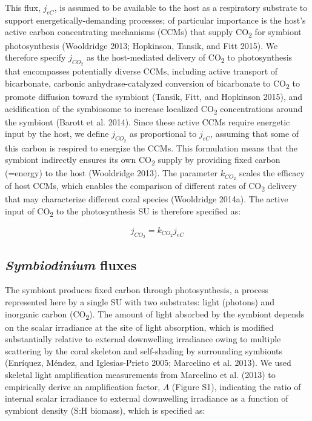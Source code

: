 \documentclass[]{elsarticle} %
\begin{document}
This flux, \(j_{eC}\), is assumed to be available to the host as a
respiratory substrate to support energetically-demanding processes; of
particular importance is the host's active carbon concentrating
mechanisms (CCMs) that supply CO\textsubscript{2} for symbiont
photosynthesis (Wooldridge 2013; Hopkinson, Tansik, and Fitt 2015). We
therefore specify \(j_{CO_2}\) as the host-mediated delivery of
CO\textsubscript{2} to photosynthesis that encompasses potentially
diverse CCMs, including active transport of bicarbonate, carbonic
anhydrase-catalyzed conversion of bicarbonate to CO\textsubscript{2} to
promote diffusion toward the symbiont (Tansik, Fitt, and Hopkinson
2015), and acidification of the symbiosome to increase localized
CO\textsubscript{2} concentrations around the symbiont (Barott et al.
2014). Since these active CCMs require energetic input by the host, we
define \(j_{CO_2}\) as proportional to \(j_{eC}\), assuming that some of
this carbon is respired to energize the CCMs. This formulation means
that the symbiont indirectly ensures its own CO\textsubscript{2} supply
by providing fixed carbon (=energy) to the host (Wooldridge 2013). The
parameter \(k_{CO_2}\) scales the efficacy of host CCMs, which enables
the comparison of different rates of CO\textsubscript{2} delivery that
may characterize different coral species (Wooldridge 2014a). The active
input of CO\textsubscript{2} to the photosynthesis SU is therefore
specified as:

\begin{equation} j_{CO_2} = k_{CO_2}j_{eC} \end{equation}

\subsection{\texorpdfstring{\emph{Symbiodinium}
fluxes}{Symbiodinium fluxes}}\label{symbiodinium-fluxes}

The symbiont produces fixed carbon through photosynthesis, a process
represented here by a single SU with two substrates: light (photons) and
inorganic carbon (CO\textsubscript{2}). The amount of light absorbed by
the symbiont depends on the scalar irradiance at the site of light
absorption, which is modified substantially relative to external
downwelling irradiance owing to multiple scattering by the coral
skeleton and self-shading by surrounding symbionts (Enríquez, Méndez,
and Iglesias-Prieto 2005; Marcelino et al. 2013). We used skeletal light
amplification measurements from Marcelino et al. (2013) to empirically
derive an amplification factor, \(A\) (Figure S1), indicating the ratio
of internal scalar irradiance to external downwelling irradiance as a
function of symbiont density (S:H biomass), which is specified as:
\end{document}
